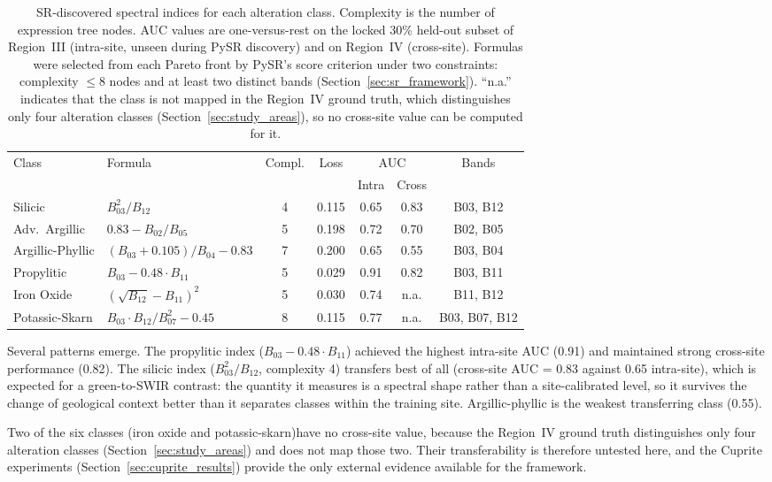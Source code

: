 \documentclass[preprint,authoryear,number]{elsarticle}
\begin{document}
\begin{table}[h]
\centering
\caption{SR-discovered spectral indices for each alteration class. Complexity is the number of expression tree nodes. AUC values are one-versus-rest on the locked 30\% held-out subset of Region~III (intra-site, unseen during PySR discovery) and on Region~IV (cross-site). Formulas were selected from each Pareto front by PySR's score criterion under two constraints: complexity $\leq 8$ nodes and at least two distinct bands (Section~\ref{sec:sr_framework}). ``n.a.'' indicates that the class is not mapped in the Region~IV ground truth, which distinguishes only four alteration classes (Section~\ref{sec:study_areas}), so no cross-site value can be computed for it.}
\label{tab:sr_formulas}
\begin{tabular}{llccccc}
\toprule
Class & Formula & Compl. & Loss & \multicolumn{2}{c}{AUC} & Bands \\
\cmidrule(lr){5-6}
 & & & & Intra & Cross & \\
\midrule
Silicic & $B_{03}^2 / B_{12}$ & 4 & 0.115 & 0.65 & 0.83 & B03, B12 \\
Adv.\ Argillic & $0.83 - B_{02}/B_{05}$ & 5 & 0.198 & 0.72 & 0.70 & B02, B05 \\
Argillic-Phyllic & $(B_{03} + 0.105)/B_{04} - 0.83$ & 7 & 0.200 & 0.65 & 0.55 & B03, B04 \\
Propylitic & $B_{03} - 0.48 \cdot B_{11}$ & 5 & 0.029 & 0.91 & 0.82 & B03, B11 \\
Iron Oxide & $(\sqrt{B_{12}} - B_{11})^2$ & 5 & 0.030 & 0.74 & n.a. & B11, B12 \\
Potassic-Skarn & $B_{03} \cdot B_{12} / B_{07}^2 - 0.45$ & 8 & 0.115 & 0.77 & n.a. & B03, B07, B12 \\
\bottomrule
\end{tabular}
\end{table}

Several patterns emerge. The propylitic index ($B_{03} - 0.48 \cdot B_{11}$) achieved the highest intra-site AUC (0.91) and maintained strong cross-site performance (0.82). The silicic index ($B_{03}^2/B_{12}$, complexity 4) transfers best of all (cross-site AUC = 0.83 against 0.65 intra-site), which is expected for a green-to-SWIR contrast: the quantity it measures is a spectral shape rather than a site-calibrated level, so it survives the change of geological context better than it separates classes within the training site. Argillic-phyllic is the weakest transferring class (0.55).

Two of the six classes (iron oxide and potassic-skarn)have no cross-site value, because the Region~IV ground truth distinguishes only four alteration classes (Section~\ref{sec:study_areas}) and does not map those two. Their transferability is therefore untested here, and the Cuprite experiments (Section~\ref{sec:cuprite_results}) provide the only external evidence available for the framework.
\end{document}
